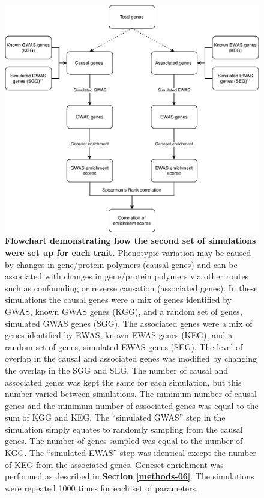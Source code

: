 \documentclass[11pt,twoside]{bristolthesis}
\begin{document}
\begin{figure}

{\centering \includegraphics[width=1\linewidth]{figure/06-ewas_gwas_comparison/architecture-simulations-schematic} 

}

\caption[Flowchart demonstrating how the second set of simulations were set up for each trait]{\textbf{Flowchart demonstrating how the second set of simulations were set up for each trait.} Phenotypic variation may be caused by changes in gene/protein polymers (causal genes) and can be associated with changes in gene/protein polymers via other routes such as confounding or reverse causation (associated genes). In these simulations the causal genes were a mix of genes identified by GWAS, known GWAS genes (KGG), and a random set of genes, simulated GWAS genes (SGG). The associated genes were a mix of genes identified by EWAS, known EWAS genes (KEG), and a random set of genes, simulated EWAS genes (SEG). The level of overlap in the causal and associated genes was modified by changing the overlap in the SGG and SEG. The number of causal and associated genes was kept the same for each simulation, but this number varied between simulations. The minimum number of causal genes and the minimum number of associated genes was equal to the sum of KGG and KEG. The ``simulated GWAS'' step in the simulation simply equates to randomly sampling from the causal genes. The number of genes sampled was equal to the number of KGG. The ``simulated EWAS'' step was identical except the number of KEG from the associated genes. Geneset enrichment was performed as described in \textbf{Section \ref{methods-06}}. The simulations were repeated 1000 times for each set of parameters.}\label{fig:arch-simulations-schematic}
\end{figure}
\end{document}
